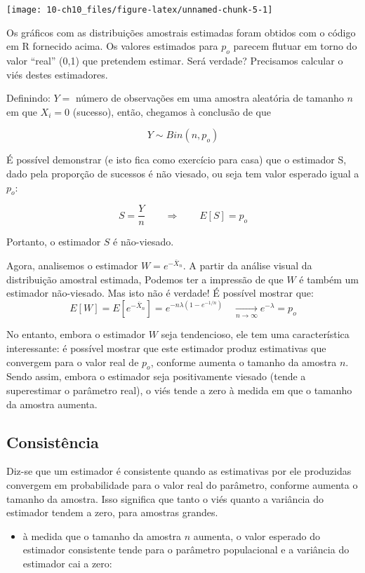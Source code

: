 \documentclass[
]{book}
\providecommand{\tightlist}{%
  \setlength{\itemsep}{0pt}\setlength{\parskip}{0pt}}
\theoremstyle{definition}
\theoremstyle{definition}
\theoremstyle{definition}
\theoremstyle{remark}
\begin{document}
\texttt{[image: 10-ch10\_files/figure-latex/unnamed-chunk-5-1]}

Os gráficos com as distribuições amostrais estimadas foram obtidos com o código em R fornecido acima. Os valores estimados para \(p_o\) parecem flutuar em torno do valor ``real'' (0,1) que pretendem estimar. Será verdade? Precisamos calcular o viés destes estimadores.

Definindo:
\(Y =\) número de observações em uma amostra aleatória de tamanho \(n\) em que \(X_i = 0\) (sucesso), então, chegamos à conclusão de que

\[Y \sim Bin(n, p_o)\]

É possível demonstrar (e isto fica como exercício para casa) que o estimador S, dado pela proporção de sucessos é não viesado, ou seja tem valor esperado igual a \(p_o\):

\[S = \frac{Y}{n} \qquad \Rightarrow \qquad E[S] = p_o\]

Portanto, o estimador \(S\) é não-viesado.

Agora, analisemos o estimador \(W = e^{-\bar{X}_n}\). A partir da análise visual da distribuição amostral estimada, Podemos ter a impressão de que \(W\) é também um estimador não-viesado. Mas isto não é verdade! É possível mostrar que:
\[E[W] = E[e^{-\bar{X}_n}] = e^{-n\lambda(1- e^{-1/n})}
  \quad \underset{n \rightarrow \infty}{\longrightarrow} e^{-\lambda} = p_o\]

No entanto, embora o estimador \(W\) seja tendencioso, ele tem uma característica interessante: é possível mostrar que este estimador produz estimativas que convergem para o valor real de \(p_o\), conforme aumenta o tamanho da amostra \(n\). Sendo assim, embora o estimador seja positivamente viesado (tende a superestimar o parâmetro real), o viés tende a zero à medida em que o tamanho da amostra aumenta.

\hypertarget{consistuxeancia}{%
\subsection*{Consistência}\label{consistuxeancia}}

Diz-se que um estimador é consistente quando as estimativas por ele produzidas convergem em probabilidade para o valor real do parâmetro, conforme aumenta o tamanho da amostra. Isso significa que tanto o viés quanto a variância do estimador tendem a zero, para amostras grandes.

\begin{itemize}
\tightlist
\item
  à medida que o tamanho da amostra \(n\) aumenta, o valor esperado do estimador consistente tende para o parâmetro populacional e a variância do estimador cai a zero:
\end{itemize}
\end{document}
